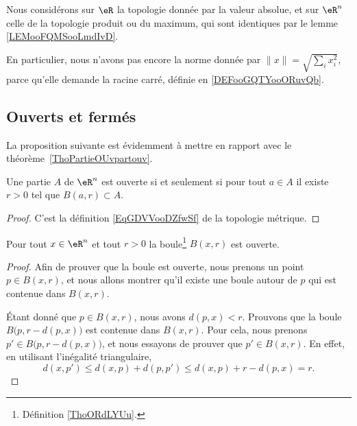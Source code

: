 Nous considérons sur \( \eR\) la topologie donnée par la valeur absolue, et sur \( \eR^n\) celle de la topologie produit ou du maximum, qui sont identiques par le lemme \ref{LEMooFQMSooLmdIvD}.

En particulier, nous n'avons pas encore la norme donnée par \( \| x \|=\sqrt{ \sum_ix_i^2 }\), parce qu'elle demande la racine carré, définie en \ref{DEFooGQTYooORuvQb}.

\subsection{Ouverts et fermés}

La proposition suivante est évidemment à mettre en rapport avec le théorème~\ref{ThoPartieOUvpartouv}.
\begin{proposition}\label{PROPooEQYJooBbPiAj}
	Une partie \( A\) de \( \eR^n\) est ouverte si et seulement si pour tout \( a\in A\) il existe \( r>0\) tel que \( B(a,r)\subset A\).
\end{proposition}

\begin{proof}
	C'est la définition \ref{EqGDVVooDZfwSf} de la topologie métrique.
\end{proof}

\begin{lemma}   \label{LemMESSExh}
	Pour tout \( x \in \eR^n\) et tout \( r >0\) la boule\footnote{Définition \ref{ThoORdLYUu}.} \( B(x,r)\) est ouverte.
\end{lemma}

\begin{proof}
	Afin de prouver que la boule est ouverte, nous prenons un point \( p\in B(x,r)\), et nous allons montrer qu'il existe une boule autour de \( p\) qui est contenue dans \( B(x,r)\).

	Étant donné que \( p\in B(x,r)\), nous avons \( d(p,x)<r\). Prouvons que la boule \( B\big(p,r-d(p,x)\big)\) est contenue dans \( B(x,r)\). Pour cela, nous prenons \( p'\in B\big(p,r-d(p,x)\big)\), et nous essayons de prouver que \( p'\in B(x,r)\). En effet, en utilisant l'inégalité triangulaire,
	\begin{equation}
		d(x,p')\leq d(x,p)+d(p,p')\leq d(x,p)+r-d(p,x)=r.
	\end{equation}
\end{proof}

